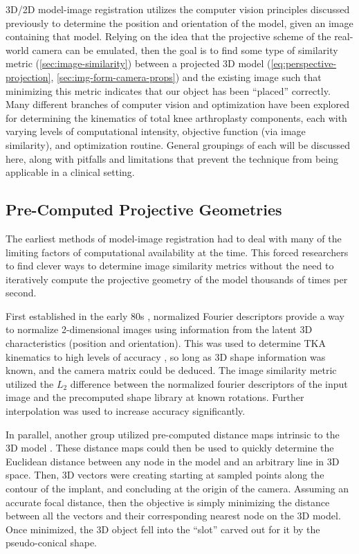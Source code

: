 3D/2D model-image registration utilizes the computer vision principles discussed previously to determine the position and orientation of the model, given an image containing that model. Relying on the idea that the projective scheme of the real-world camera can be emulated, then the goal is to find some type of similarity metric (\cref{sec:image-similarity}) between a projected 3D model (\cref{eq:perspective-projection}, \cref{sec:img-form-camera-props}) and the existing image such that minimizing this metric indicates that our object has been ``placed'' correctly. Many different branches of computer vision and optimization have been explored for determining the kinematics of total knee arthroplasty components, each with varying levels of computational intensity, objective function (via image similarity), and optimization routine. General groupings of each will be discussed here, along with pitfalls and limitations that prevent the technique from being applicable in a clinical setting.

\subsection{Pre-Computed Projective Geometries}
The earliest methods of model-image registration had to deal with many of the limiting factors of computational availability at the time. This forced researchers to find clever ways to determine image similarity metrics without the need to iteratively compute the projective geometry of the model thousands of times per second.

First established in the early 80s \cite{wallaceAnalysisThreedimensionalMovement1980,wallaceEfficientThreedimensionalAircraft1980}, normalized Fourier descriptors provide a way to normalize 2-dimensional images using information from the latent 3D characteristics (position and orientation). This was used to determine TKA kinematics to high levels of accuracy \cite{banksModelBased3D1992,banksAccurateMeasurementThreedimensional1996}, so long as 3D shape information was known, and the camera matrix could be deduced. The image similarity metric utilized the $L_2$ difference between the normalized fourier descriptors of the input image and the precomputed shape library at known rotations. Further interpolation was used to increase accuracy significantly.

In parallel, another group utilized pre-computed distance maps intrinsic to the 3D model \cite{lavalleeRecoveringPositionOrientation1995,zuffiModelbasedMethodReconstruction1999}. These distance maps could then be used to quickly determine the Euclidean distance between any node in the model and an arbitrary line in 3D space. Then, 3D vectors were creating starting at sampled points along the contour of the implant, and concluding at the origin of the camera. Assuming an accurate focal distance, then the objective is simply minimizing the distance between all the vectors and their corresponding nearest node on the 3D model. Once minimized, the 3D object fell into the ``slot'' carved out for it by the pseudo-conical shape.


